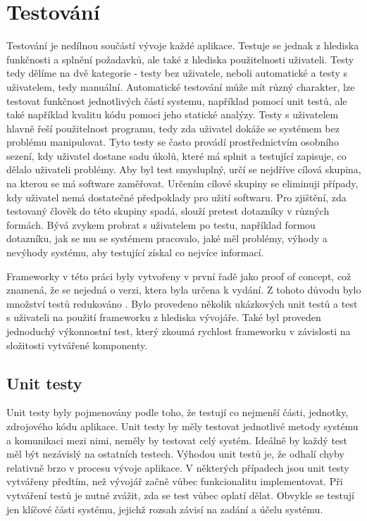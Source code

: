 \chapter{Testování} 		
Testování je nedílnou součástí vývoje každé aplikace. Testuje se jednak z hlediska funkčnosti a splnění požadavků, ale také z hlediska použitelnosti uživateli. Testy tedy dělíme na dvě kategorie - testy bez uživatele, neboli automatické a testy s uživatelem, tedy manuální.  Automatické testování může mít různý charakter, lze testovat funkčnost jednotlivých částí systemu, například pomocí unit testů, ale také například kvalitu kódu pomoci jeho statické analýzy. Testy s uživatelem hlavně řeší použitelnost programu, tedy zda uživatel dokáže se systémem bez problému manipulovat. Tyto testy se často provádí prostřednictvím osobního sezení, kdy uživatel dostane sadu úkolů, které má splnit a testující zapisuje, co dělalo uživateli problémy. Aby byl test smysluplný, určí se nejdříve cílová skupina, na kterou se má software zaměřovat. Určením cílové skupiny se eliminuji případy, kdy uživatel nemá dostatečné předpoklady pro užití softwaru. Pro zjištění, zda testovaný člověk do této skupiny spadá, slouží pretest dotazníky v různých formách. Bývá zvykem probrat s uživatelem po testu, například formou dotazníku, jak se mu se systémem pracovalo, jaké měl problémy, výhody a nevýhody systému, aby testující získal co nejvíce informací.  

Frameworky v této práci byly vytvořeny v první řadě jako proof of concept, což znamená, že se nejedná o verzi, ktera byla určena k vydání. Z tohoto důvodu bylo množství testů redukováno . Bylo provedeno několik ukázkových unit testů a test s uživateli na použití frameworku z hlediska vývojáře. Také byl proveden jednoduchý výkonnostní test, který zkoumá rychlost frameworku v závislosti na složitosti vytvářené komponenty.

\section{Unit testy} 
Unit testy byly pojmenovány podle toho, že testují co nejmenší části, jednotky, zdrojového kódu aplikace. Unit testy by měly testovat jednotlivé metody systému a komunikaci mezi nimi, neměly by testovat celý systém. Ideálně by každý test měl být nezávislý na ostatních testech. Výhodou unit testů je, že odhalí chyby relativně brzo v procesu vývoje aplikace. V některých případech jsou unit testy vytvářeny předtím, než vývojář začně vůbec funkcionalitu implementovat. Při vytváření testů je nutné zvážit, zda se test vůbec oplatí dělat. Obvykle se testují jen klíčové části systému, jejichž rozsah závisí na zadání a účelu systému.  

